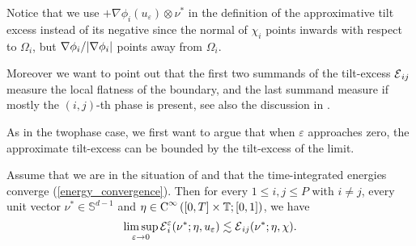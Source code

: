 Notice that we use $ + \nabla \phi_{ i } ( u_{ \varepsilon } ) \otimes \nu^{ 
	\ast } $ in the definition of the approximative tilt excess instead of its 
negative since the normal of $ \chi_{ i } $ points inwards with respect to $ 
\Omega_{ i } $, but $ \nabla \phi_{ i } / \abs{ \nabla \phi_{ i } } $ points 
away from $ \Omega_{ i } $.

Moreover we want to point out that the first two summands of the tilt-excess $ 
\tilt_excess_{ i j } $ measure the local flatness of the boundary, and the 
last summand measure if mostly the $(i,j)$-th phase is present, see also the 
discussion in .

As in the twophase case, we first want to argue that when $ \varepsilon $ 
approaches zero, the approximate tilt-excess can be bounded by the tilt-excess 
of the limit.

\begin{lemma}
	\label{approximate_tilt_excess_estimated_in_limit_by_tilt_excess}
	Assume that we are in the situation of 
	 and that the time-integrated 
	energies converge (\ref{energy_convergence}). Then for every $ 1 \leq i , j 
	\leq P $ with $ i \neq j $, every unit vector $ \nu^{ \ast } \in \mathbb{ S 
	}^{ d - 1 } $ and 
	$ \eta \in \operatorname{C}^{ \infty } \left( [ 0 , T ] \times \operatorname{\mathbb{T}} ; [ 0 ,1 ] 
	\right) $, we have
	\begin{equation*}
		\limsup_{ \varepsilon \to 0 }
		\tilt_excess_{ i }^{ \varepsilon } ( \nu^{ \ast } ; \eta , u_{ 
			\varepsilon } ) 
		\lesssim
		\tilt_excess_{ i j } ( \nu^{ \ast } ; \eta , \chi ).
	\end{equation*}
\end{lemma}

